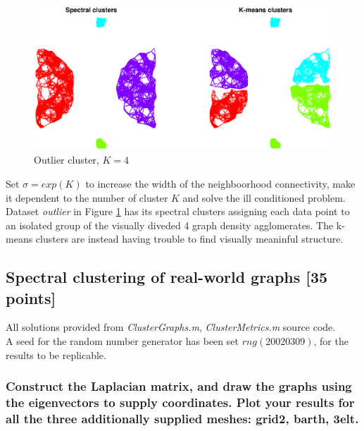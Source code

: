 \documentclass[unicode,11pt,a4paper,oneside,numbers=endperiod,openany]{scrartcl}
\begin{document}
\begin{figure}[H]
    \centering
    \caption{Outlier cluster, $K=4$}
    \label{fig:ex1-7-outlier}
    \includegraphics[width=\textwidth, trim={3cm 2cm 3cm 0cm}]{./img/ex1-7-outlier.eps}
\end{figure}

Set $\sigma=exp(K)$ to increase the width of the neighboorhood connectivity,
make it dependent to the number of cluster $K$ and solve the ill conditioned problem. \\
Dataset \textit{outlier} in Figure \ref{fig:ex1-7-outlier} has its spectral clusters
assigning each data point to an isolated group of the visually diveded 4 graph density agglomerates.
The k-means clusters are instead having trouble to find visually meaninful structure.

\cleardoublepage


\subsection{Spectral clustering of real-world graphs [35 points]}

All solutions provided from \textit{ClusterGraphs.m}, \textit{ClusterMetrics.m} source code.\\
A seed for the random number generator has been set $rng(20020309)$, for the results to be replicable.

\subsubsection{
    Construct the Laplacian matrix, and draw the graphs using the eigenvectors to supply coordinates.
    Plot your results for all the three additionally supplied meshes: grid2, barth, 3elt.}
\end{document}
